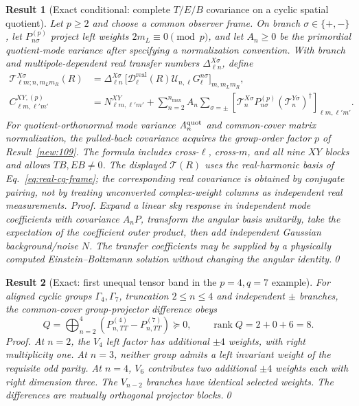 \documentclass[aps,prd,onecolumn,notitlepage,groupedaddress,11pt]{revtex4-2}
\newtheorem{result}{Result}
\begin{document}
\begin{result}[\textsf{Exact conditional}: complete $T/E/B$ covariance on a cyclic spatial quotient]\label{new:208}
Let $p\ge2$ and choose a common observer frame. On branch $\sigma\in\{+,-\}$, let $P_{n\sigma}^{(p)}$ project left weights $2m_L\equiv0\pmod p$, and let $A_n\ge0$ be the primordial quotient-mode variance after specifying a normalization convention. With branch and multipole-dependent real transfer numbers $\Delta^{X\sigma}_{\ell n}$, define
\begin{equation}\label{eq:fulltensor}
\begin{aligned}
\mathcal T^{X\sigma}_{\ell m;n,m_Lm_R}(R)
&=\Delta^{X\sigma}_{\ell n}\,
\big[\mathcal D_{\ell}^{\mathrm{real}}(R)\mathcal U_{n,\ell}G^{n\sigma}_{\ell}\big]_{m,m_Lm_R},\\
C^{XY,(p)}_{\ell m,\ell'm'}
&=N^{XY}_{\ell m,\ell'm'}+
\sum_{n=2}^{n_{\max}}A_n\!\sum_{\sigma=\pm}
[\mathcal T^{X\sigma}_nP_{n\sigma}^{(p)}(\mathcal T^{Y\sigma}_n)^\dagger]_{\ell m,\ell'm'} .
\end{aligned}
\end{equation}
For quotient-orthonormal mode variance $A_n^{\rm quot}$ and common-cover matrix normalization, the pulled-back covariance acquires the group-order factor $p$ of Result~\ref{new:109}. The formula includes cross-$\ell$, cross-$m$, and all nine $XY$ blocks and allows $TB,EB\ne0$. The displayed $\mathcal T(R)$ uses the real-harmonic basis of Eq.~\eqref{eq:real-cg-frame}; the corresponding real covariance is obtained by conjugate pairing, not by treating unconverted complex-weight columns as independent real measurements. \textit{Proof.} Expand a linear sky response in independent mode coefficients with covariance $A_nP$, transform the angular basis unitarily, take the expectation of the coefficient outer product, then add independent Gaussian background/noise $N$. The transfer coefficients may be supplied by a physically computed Einstein--Boltzmann solution without changing the angular identity.\qed
\end{result}

\begin{result}[\textsf{Exact}: first unequal tensor band in the $p=4,q=7$ example]\label{new:209}
For aligned cyclic groups $\Gamma_4,\Gamma_7$, truncation $2\le n\le4$ and independent $\pm$ branches, the common-cover group-projector difference obeys
\begin{equation}\label{eq:rank8}
Q=\bigoplus_{n=2}^4\left(P_{n,TT}^{(4)}-P_{n,TT}^{(7)}\right)\succeq0,\qquad
\operatorname{rank} Q=2+0+6=8.
\end{equation}
\textit{Proof.} At $n=2$, the $V_4$ left factor has additional $\pm4$ weights, with right multiplicity one. At $n=3$, neither group admits a left invariant weight of the requisite odd parity. At $n=4$, $V_6$ contributes two additional $\pm4$ weights each with right dimension three. The $V_{n-2}$ branches have identical selected weights. The differences are mutually orthogonal projector blocks.\qed
\end{result}
\end{document}
